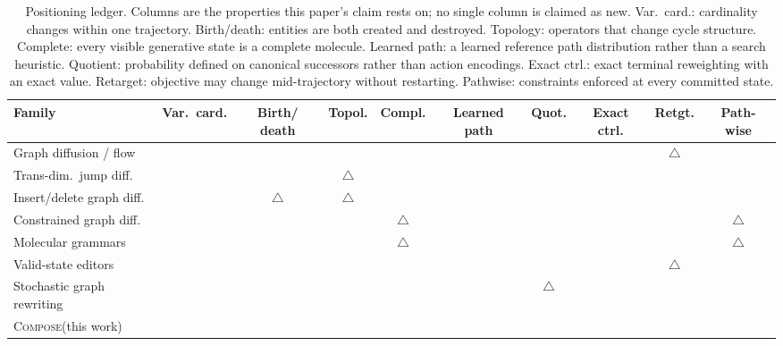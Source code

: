 \documentclass{article}
\newcommand{\method}{\textsc{Compose}\xspace}
\newcommand{\cmark}{\ding{51}}
\newcommand{\xmark}{\ding{55}}
\newcommand{\partialmark}{\ensuremath{\triangle}}
\theoremstyle{definition}
\theoremstyle{remark}
\begin{document}
\begin{table}[tb]
\centering
\caption{Positioning ledger. Columns are the properties this paper's claim rests on; no single column is claimed as new. Var.\ card.: cardinality changes within one trajectory. Birth/death: entities are both created and destroyed. Topology: operators that change cycle structure. Complete: every visible generative state is a complete molecule. Learned path: a learned reference path distribution rather than a search heuristic. Quotient: probability defined on canonical successors rather than action encodings. Exact ctrl.: exact terminal reweighting with an exact value. Retarget: objective may change mid-trajectory without restarting. Pathwise: constraints enforced at every committed state.}
\label{tab:positioning}
\scriptsize
\setlength{\tabcolsep}{3pt}
\begin{tabular*}{\textwidth}{@{\extracolsep{\fill}}lccccccccc}
\toprule
Family & Var.\ card. & Birth/ death & Topol. & Compl. & Learned path & Quot. & Exact ctrl. & Retgt. & Path- wise\\
\midrule
Graph diffusion / flow & \xmark & \xmark & \cmark & \xmark & \cmark & \xmark & \xmark & \partialmark & \xmark\\
Trans-dim.\ jump diff. & \cmark & \cmark & \partialmark & \xmark & \cmark & \xmark & \xmark & \xmark & \xmark\\
Insert/delete graph diff. & \cmark & \partialmark & \partialmark & \xmark & \cmark & \xmark & \xmark & \xmark & \xmark\\
Constrained graph diff. & \xmark & \xmark & \cmark & \partialmark & \cmark & \xmark & \xmark & \xmark & \partialmark\\
Molecular grammars & \cmark & \cmark & \cmark & \partialmark & \cmark & \xmark & \xmark & \xmark & \partialmark\\
Valid-state editors & \cmark & \cmark & \cmark & \cmark & \xmark & \xmark & \xmark & \partialmark & \cmark\\
Stochastic graph rewriting & \cmark & \cmark & \cmark & \cmark & \xmark & \partialmark & \xmark & \xmark & \cmark\\
\midrule
\method (this work) & \cmark & \cmark & \cmark & \cmark & \cmark & \cmark & \cmark & \cmark & \cmark\\
\bottomrule
\end{tabular*}
\end{table}
\end{document}
